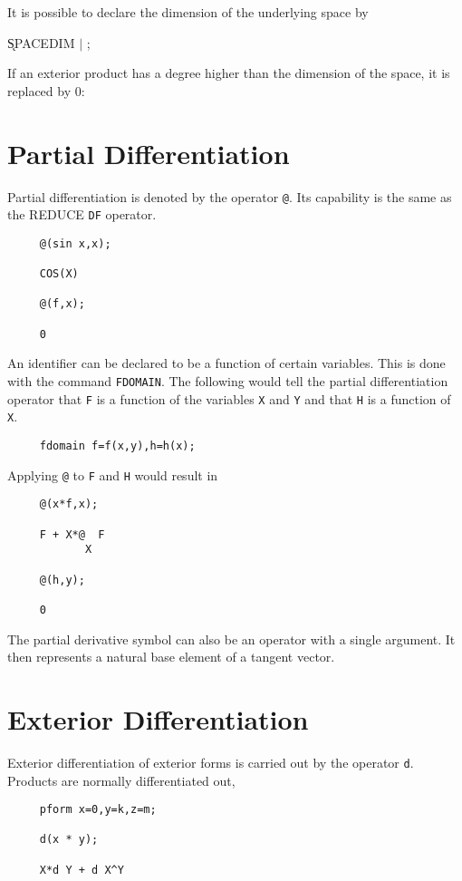 \documentclass[11pt,letterpaper]{book}
\newcommand{\REDUCE}{REDUCE}
\begin{document}
It is possible to declare the dimension of the underlying space
by\label{SPACEDIM}

\hspace*{2em} \k{SPACEDIM}  $\mid$ ;

If an exterior product has a degree higher than the dimension of the
space, it is replaced by 0:

\section{Partial Differentiation}

Partial differentiation is denoted by the operator {\tt @}\label{at}.
Its capability is the same as the {\REDUCE} {\tt DF} operator.

\example{}

{\small\begin{verbatim}
     @(sin x,x);

     COS(X)

     @(f,x);

     0
\end{verbatim}}

An identifier can be declared to be a function of certain variables.
This is done with the command {\tt FDOMAIN}\label{FDOMAIN}.  The
following would tell the partial differentiation operator that {\tt F}
is a function of the variables {\tt X} and {\tt Y} and that {\tt H} is
a function of {\tt X}.

{\small\begin{verbatim}
     fdomain f=f(x,y),h=h(x);
\end{verbatim}}

Applying {\tt @} to {\tt F} and {\tt H} would result in

{\small\begin{verbatim}
     @(x*f,x);

     F + X*@  F
            X

     @(h,y);

     0
\end{verbatim}}

The partial derivative symbol can also be an operator with a single
argument.  It then represents a natural base element of a tangent
vector\label{at1}.

\section{Exterior Differentiation}
Exterior differentiation of exterior forms is carried out by the
operator {\tt d}\label{d}.  Products are normally differentiated out,
{\small\begin{verbatim}
     pform x=0,y=k,z=m;

     d(x * y);

     X*d Y + d X^Y
\end{verbatim}}
\end{document}
